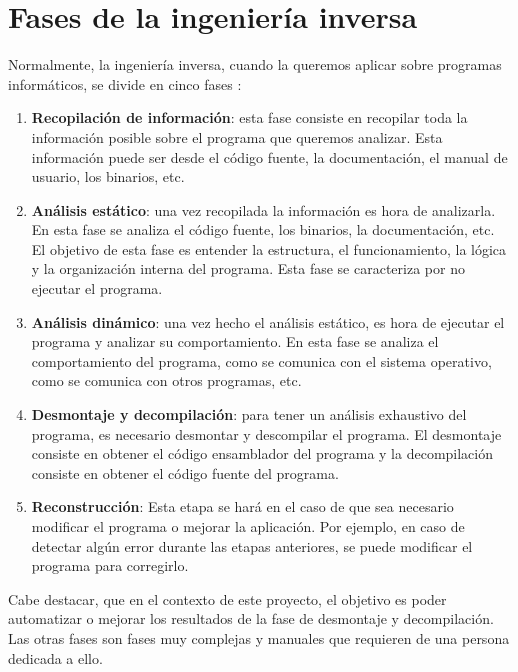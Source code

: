 \section{Fases de la ingeniería inversa}
\label{sec:fases}


Normalmente, la ingeniería inversa, cuando la queremos aplicar sobre programas informáticos, se divide en
cinco fases \cite{FasesIngineriaInversa}:

\begin{enumerate}
    \item \textbf{Recopilación de información}: esta fase consiste en recopilar toda la información posible
        sobre el programa que queremos analizar. Esta información puede ser desde el código fuente, la
        documentación, el manual de usuario, los binarios, etc.
    \item \textbf{Análisis estático}: una vez recopilada la información es hora de analizarla. En esta fase
        se analiza el código fuente, los binarios, la documentación, etc. El objetivo de esta fase es
        entender la estructura, el funcionamiento, la lógica y la organización interna del programa. Esta fase
        se caracteriza por no ejecutar el programa.
    \item \textbf{Análisis dinámico}: una vez hecho el análisis estático, es hora de ejecutar el programa
        y analizar su comportamiento. En esta fase se analiza el comportamiento del programa, como se comunica
        con el sistema operativo, como se comunica con otros programas, etc.
    \item \textbf{Desmontaje y decompilación}: para tener un análisis exhaustivo del programa, es necesario
        desmontar y descompilar el programa. El desmontaje consiste en obtener el código ensamblador del programa
        y la decompilación consiste en obtener el código fuente del programa.
    \item \textbf{Reconstrucción}: Esta etapa se hará en el caso de que sea necesario modificar el programa o
        mejorar la aplicación. Por ejemplo, en caso de detectar algún error durante las etapas anteriores, se
        puede modificar el programa para corregirlo.
\end{enumerate}

Cabe destacar, que en el contexto de este proyecto, el objetivo es poder automatizar o mejorar los resultados
de la fase de desmontaje y decompilación. Las otras fases son fases muy complejas y manuales que requieren
de una persona dedicada a ello.


